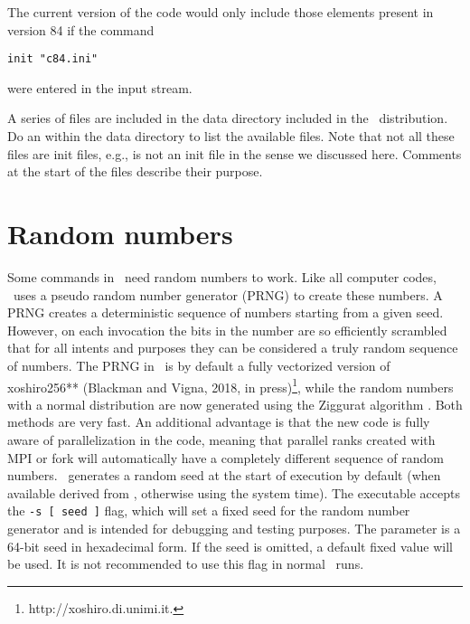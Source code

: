 The current version of the code would only include those elements present
in version 84 if the command
\begin{verbatim}
init "c84.ini"
\end{verbatim}
were entered in the input stream.

A series of  files are included in the
data directory included in the \Cloudy\ distribution.
Do an  within the data directory
to list the available files. Note that not all these files
are init files, e.g.,  is not
an init file in the sense we discussed here.
Comments at the start of the files describe
their purpose.

\section{Random numbers}

Some commands in \Cloudy\ need random numbers to work. Like all computer
codes, \Cloudy\ uses a pseudo random number generator (PRNG) to create these
numbers. A PRNG creates a deterministic sequence of numbers starting from a
given seed. However, on each invocation the bits in the number are so
efficiently scrambled that for all intents and purposes they can be considered
a truly random sequence of numbers. The PRNG in \Cloudy\ is by default a fully
vectorized version of xoshiro256** (Blackman and Vigna, 2018, in
press)\footnote{http://xoshiro.di.unimi.it.}, while the random numbers with a
normal distribution are now generated using the Ziggurat algorithm
\citep{MarsagliaTsang00}. Both methods are very fast. An additional advantage
is that the new code is fully aware of parallelization in the code, meaning
that parallel ranks created with MPI or fork will automatically have a
completely different sequence of random numbers. \Cloudy\ generates a random
seed at the start of execution by default (when available derived from
, otherwise using the system time). The executable
accepts the {\tt -s~[~seed~]} flag, which will set a fixed seed for the random
number generator and is intended for debugging and testing purposes. The
parameter is a 64-bit seed in hexadecimal form. If the seed is omitted, a
default fixed value will be used. It is not recommended to use this flag in
normal \Cloudy\ runs.
